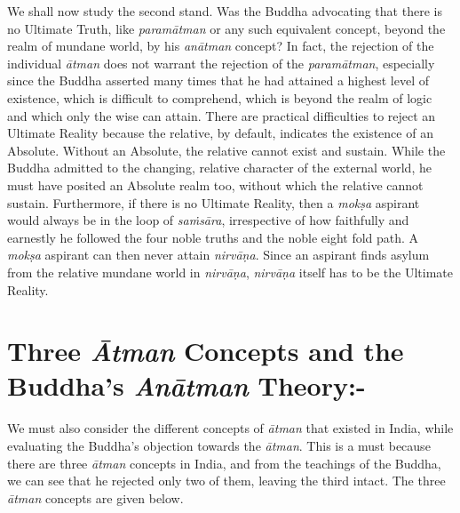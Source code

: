 We shall now study the second stand. Was the Buddha advocating that there is no Ultimate Truth, like \textit{paramātman} or any such equivalent concept, beyond the realm of mundane world, by his \textit{anātman} concept? In fact, the rejection of the individual \textit{ātman} does not warrant the rejection of the \textit{paramātman}, especially since the Buddha asserted many times that he had attained a highest level of existence, which is difficult to comprehend, which is beyond the realm of logic and which only the wise can attain. There are practical difficulties to reject an Ultimate Reality because the relative, by default, indicates the existence of an Absolute. Without an Absolute, the relative cannot exist and sustain. While the Buddha admitted to the changing, relative character of the external world, he must have posited an Absolute realm too, without which the relative cannot sustain. Furthermore, if there is no Ultimate Reality, then a \textit{mokṣa} aspirant would always be in the loop of \textit{saṁsāra}, irrespective of how faithfully and earnestly he followed the four noble truths and the noble eight fold path. A \textit{mokṣa} aspirant can then never attain \textit{nirvāṇa}. Since an aspirant finds asylum from the relative mundane world in \textit{nirvāṇa}, \textit{nirvāṇa} itself has to be the Ultimate Reality.

\vspace{-.3cm}

\section*{Three \textit{Ātman} Concepts \hfill\break and the Buddha’s \textit{Anātman} Theory:-}

We must also consider the different concepts of \textit{ātman} that existed in India, while evaluating the Buddha’s objection towards the \textit{ātman}. This is a must because there are three \textit{ātman} concepts in India, and from the teachings of the Buddha, we can see that he rejected only two of them, leaving the third intact. The three \textit{ātman} concepts are given below.

